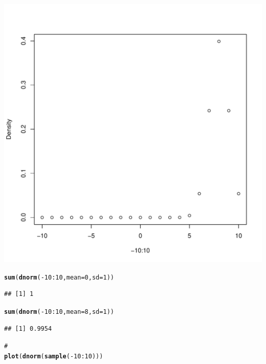 \documentclass{article}\usepackage[]{graphicx}\usepackage[]{color}
\makeatletter
\def\maxwidth{ %
  \ifdim\Gin@nat@width>\linewidth
    \linewidth
  \else
    \Gin@nat@width
  \fi
}
\newcommand{\hlnum}[1]{\textcolor[rgb]{0.686,0.059,0.569}{#1}}%
\newcommand{\hlcom}[1]{\textcolor[rgb]{0.678,0.584,0.686}{\textit{#1}}}%
\newcommand{\hlopt}[1]{\textcolor[rgb]{0,0,0}{#1}}%
\newcommand{\hlstd}[1]{\textcolor[rgb]{0.345,0.345,0.345}{#1}}%
\newcommand{\hlkwc}[1]{\textcolor[rgb]{0.333,0.667,0.333}{#1}}%
\newcommand{\hlkwd}[1]{\textcolor[rgb]{0.737,0.353,0.396}{\textbf{#1}}}%
\newenvironment{kframe}{%
 \def\at@end@of@kframe{}%
 \ifinner\ifhmode%
  \def\at@end@of@kframe{\end{minipage}}%
  \begin{minipage}{\columnwidth}%
 \fi\fi%
 \def\FrameCommand##1{\hskip\@totalleftmargin \hskip-\fboxsep
 \colorbox{shadecolor}{##1}\hskip-\fboxsep
     \hskip-\linewidth \hskip-\@totalleftmargin \hskip\columnwidth}%
 \MakeFramed {\advance\hsize-\width
   \@totalleftmargin\z@ \linewidth\hsize
   \@setminipage}}%
 {\par\unskip\endMakeFramed%
 \at@end@of@kframe}
\newenvironment{knitrout}{}{} %
\makeatother
\begin{document}
\begin{knitrout}
\includegraphics[width=\maxwidth]{figure/unnamed-chunk-22} 
\begin{kframe}\begin{alltt}
\hlkwd{sum}\hlstd{(}\hlkwd{dnorm}\hlstd{(}\hlopt{-}\hlnum{10}\hlopt{:}\hlnum{10}\hlstd{,} \hlkwc{mean} \hlstd{=} \hlnum{0}\hlstd{,} \hlkwc{sd} \hlstd{=} \hlnum{1}\hlstd{))}
\end{alltt}
\begin{verbatim}
## [1] 1
\end{verbatim}
\begin{alltt}
\hlkwd{sum}\hlstd{(}\hlkwd{dnorm}\hlstd{(}\hlopt{-}\hlnum{10}\hlopt{:}\hlnum{10}\hlstd{,} \hlkwc{mean} \hlstd{=} \hlnum{8}\hlstd{,} \hlkwc{sd} \hlstd{=} \hlnum{1}\hlstd{))}
\end{alltt}
\begin{verbatim}
## [1] 0.9954
\end{verbatim}
\begin{alltt}
\hlcom{# }
\hlkwd{plot}\hlstd{(}\hlkwd{dnorm}\hlstd{(}\hlkwd{sample}\hlstd{(}\hlopt{-}\hlnum{10}\hlopt{:}\hlnum{10}\hlstd{)))}
\end{alltt}
\end{kframe}

\end{knitrout}
\end{document}
